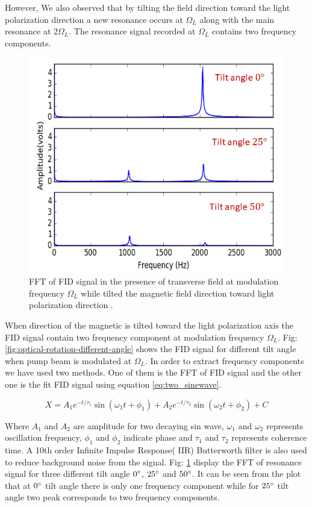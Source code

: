 However, We also observed that by tilting the field direction toward the light polarization direction a new resonance occurs at $\Omega_L$ along with the main resonance at $2\Omega_L$. The resonance signal recorded at $\Omega_L$ contains two frequency components.
\begin{figure}[h]
\centering\includegraphics[width=0.7\linewidth]{figures/fft_amp.png}
\caption{FFT of FID  signal in the presence of transverse field at modulation frequency $\Omega_L$ while tilted the magnetic field direction toward light polarization direction  .\label{fig:fft-amplitude}}
\end{figure}


When direction of the magnetic is tilted toward the light polarization axis  the FID signal contain two frequency component at modulation frequency $\Omega_L$. Fig: \ref{fig:optical-rotation-different-angle} shows the FID signal for different tilt angle when pump beam is modulated at $\Omega_L$. In order to extract frequency components we have used two methods. One of them is the FFT of FID signal and the other one is the fit FID signal using equation \ref{eq:two_sinewave}.

\begin{equation}
     X = A_1 e^{-t /\tau_1} \sin(\omega_1 t + \phi_1) + A_2 e^{-t /\tau_2}  \sin (\omega_2 t + \phi_2) + C  
     \label{eq:two_sinewave}
\end{equation}

Where $A_1$ and $A_2$ are amplitude for two decaying sin wave, $\omega_1$ and $\omega_2$ represents oscillation frequency, $\phi_1$ and $\phi_2$ indicate phase and $\tau_1$ and $\tau_2$ represents coherence time. A 10th order Infinite Impulse Response( IIR) Butterworth filter is also used to reduce background noise from the signal.
Fig: \ref{fig:fft-amplitude} display the FFT of resonance signal for three different  tilt angle $0\degree$, $25\degree$ and $50\degree$. It can be seen from the plot that at $0\degree$ tilt angle there is only one frequency component while for $25\degree$ tilt angle two peak corresponds to two frequency components.

